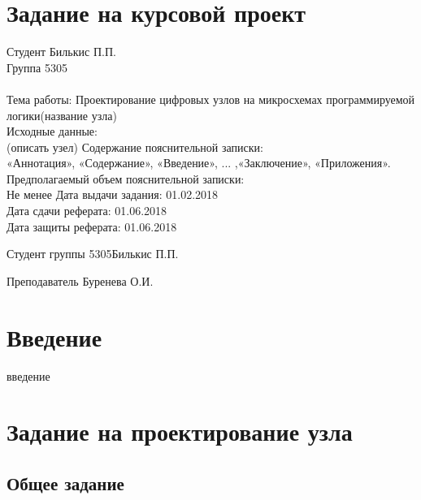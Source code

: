 \documentclass[a4paper,14pt,russian]{article}
\newcommand{\theme}{Проектирование цифровых узлов на микросхемах программируемой логики}
\newcommand{\groupnumber}{5305}
\newcommand{\studentname}{Билькис П.П.}
\newcommand{\teachername}{Буренева О.И.}
\begin{document}


\section*{Задание на курсовой проект}

Студент \studentname\\
Группа \groupnumber\\\\
Тема работы: \theme (название узла) \\
Исходные данные:\\
(описать узел)
Содержание пояснительной записки:\\
«Аннотация», «Содержание», «Введение», ... ,«Заключение», «Приложения».
Предполагаемый объем пояснительной записки:\\
Не менее \pageref{LastPage}
Дата выдачи задания: 01.02.2018\\
Дата сдачи реферата: 01.06.2018\\
Дата защиты реферата: 01.06.2018\\

\vfill


Студент группы \groupnumber \hfill \studentname


Преподаватель \hfill \teachername


\clearpage

\begin{abstract}
  абстракт на русском
\end{abstract}


\begin{abstract}
  abstract here
\end{abstract}

\clearpage

\tableofcontents
\clearpage

\section*{Введение}
введение
\clearpage

\section{Задание на проектирование узла}

\subsection{Общее задание}

\end{document}
